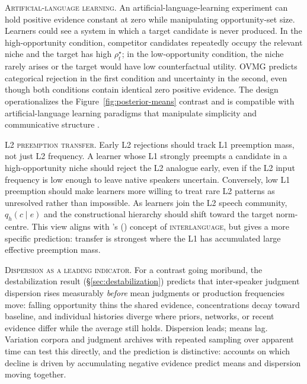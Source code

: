 \documentclass[12pt,letterpaper]{article}
\newcommand{\term}[1]{\textsc{#1}}
\newcommand{\posscite}[1]{\citeauthor{#1}'s (\citeyear{#1})}
\begin{document}
\noindent\textsc{Artificial-language learning.} An artificial-language-learning experiment can hold positive evidence constant
at zero while manipulating opportunity-set size. Learners could see a system in
which a target candidate is never produced. In the high-opportunity condition,
competitor candidates repeatedly occupy the relevant niche and the target has high
$\rho_t^\star$; in the low-opportunity condition, the niche rarely arises or the
target would have low counterfactual utility. OVMG predicts categorical
rejection in the first condition and uncertainty in the second, even though both
conditions contain identical zero positive evidence. The design operationalizes the
Figure~\ref{fig:posterior-means} contrast and is compatible with artificial-language
learning paradigms that manipulate simplicity and communicative structure
\autocite{culbertson2016simplicity}.

\noindent\textsc{L2 preemption transfer.} Early L2 rejections should track L1 preemption mass, not just L2 frequency. A
learner whose L1 strongly preempts a candidate in a high-opportunity niche
should reject the L2 analogue early, even if the L2 input frequency is low enough
to leave native speakers uncertain. Conversely, low L1 preemption should make
learners more willing to treat rare L2 patterns as unresolved rather than
impossible. As learners join the L2 speech community, $q_h(c\mid e)$ and the
constructional hierarchy should shift toward the target norm-centre. This view
aligns with \posscite{selinker1972} concept of \term{interlanguage}, but gives a
more specific prediction: transfer is strongest where the L1 has accumulated
large effective preemption mass.

\noindent\textsc{Dispersion as a leading indicator.} For a contrast going
moribund, the destabilization result (\S\ref{sec:destabilization}) predicts
that inter-speaker judgment dispersion rises measurably \emph{before} mean
judgments or production frequencies move: falling opportunity thins the shared
evidence, concentrations decay toward baseline, and individual histories diverge
where priors, networks, or recent evidence differ while the average still holds.
Dispersion leads; means lag. Variation corpora and
judgment archives with repeated sampling over apparent time can test this
directly, and the prediction is distinctive: accounts on which decline is
driven by accumulating negative evidence predict means and dispersion moving
together.
\end{document}
